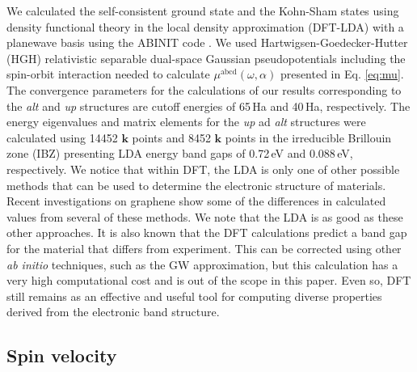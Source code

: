 \documentclass[prb,11pt,tightenlines,twocolumn,aps]{revtex4-1}
\begin{document}
We calculated the self-consistent ground state and the Kohn-Sham states using
density functional theory in the local density approximation (DFT-LDA) with a
planewave basis using the ABINIT code \cite{gonzeCPC09}. We used 
Hartwigsen-Goedecker-Hutter (HGH) relativistic separable dual-space Gaussian
pseudopotentials \cite{hartwigsenPRB98} including the spin-orbit interaction
needed to calculate $\mu^{\mathrm{abcd}}(\omega,\alpha)$ presented in Eq.
\eqref{eq:mu}.
% 
The convergence parameters for the calculations of our results corresponding to
the \emph{alt} and \emph{up} structures are cutoff energies of 65\,Ha and
40\,Ha, respectively. The energy eigenvalues and matrix elements for the
\emph{up} ad \emph{alt} structures were calculated using 14452 $\mathbf{k}$
points and 8452 $\mathbf{k}$ points in the irreducible Brillouin zone (IBZ)
presenting LDA energy band gaps of 0.72\,eV and 0.088\,eV, respectively.
% 
We notice that within DFT, the LDA is only one of other possible methods that
can be used to determine the electronic structure of materials. Recent
investigations on graphene show some of the differences in calculated values
from several of these methods\cite{karamanisJPCC15,botelloACR14}. We note that
the LDA is as good as these other approaches. It is also known that the DFT
calculations predict a band gap for the material that differs from experiment.
This can be corrected using other \emph{ab initio} techniques, such as the GW
approximation\cite{onidaRMP02}, but this calculation has a very high
computational cost and is out of the scope in this paper. Even so, DFT still
remains as an effective and useful tool for computing diverse properties derived
from the electronic band structure.


\subsection{Spin velocity} %
\label{sec:res-spin_velocity}
\end{document}
